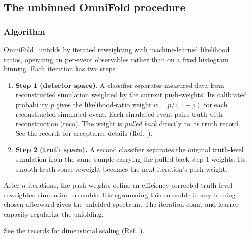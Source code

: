 \subsection{The unbinned OmniFold procedure}
\label{sec:method}

\subsubsection{Algorithm}
\label{sec:method-algo}

OmniFold~\cite{Andreassen:2019cjw,Andreassen:2021zzk} unfolds by iterated reweighting with machine-learned likelihood ratios, operating on per-event observables rather than on a fixed histogram binning. Each iteration has two steps:
\begin{enumerate}[itemsep=2pt]
\item \textbf{Step 1 (detector space).} A classifier separates measured data from reconstructed simulation weighted by the current push-weights. Its calibrated probability $p$ gives the likelihood-ratio weight $w = p/(1-p)$ for each reconstructed simulated event. Each simulated event pairs truth with reconstruction (reco). The weight is \emph{pulled back} directly to its truth record. See the records for acceptance details (Ref.~\cite{NoteRecords2026}).
  \item \textbf{Step 2 (truth space).} A second classifier separates the original truth-level simulation from the same sample carrying the pulled-back step-1 weights. Its smooth truth-space reweight becomes the next iteration's push-weight.
\end{enumerate}
After $n$ iterations, the push-weights define an efficiency-corrected truth-level reweighted simulation ensemble. Histogramming this ensemble in any binning chosen afterward gives the unfolded spectrum. The iteration count and learner capacity regularize the unfolding.

See the records for dimensional scaling (Ref.~\cite{NoteRecords2026}).

